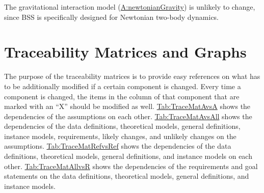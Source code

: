 \documentclass[12pt]{article}
\begin{document}
\begin{description}[font=\normalfont]
\item[Newtonian-Gravity-Model:\phantomsection\label{ucNewtonianGravity}]{The gravitational interaction model (\hyperref[newtonianGravity]{A:newtonianGravity}) is unlikely to change, since BSS is specifically designed for Newtonian two-body dynamics.}
\end{description}
\section{Traceability Matrices and Graphs}
\label{Sec:TraceMatrices}
The purpose of the traceability matrices is to provide easy references on what has to be additionally modified if a certain component is changed. Every time a component is changed, the items in the column of that component that are marked with an ``X'' should be modified as well. \hyperref[Table:TraceMatAvsA]{Tab:TraceMatAvsA} shows the dependencies of the assumptions on each other. \hyperref[Table:TraceMatAvsAll]{Tab:TraceMatAvsAll} shows the dependencies of the data definitions, theoretical models, general definitions, instance models, requirements, likely changes, and unlikely changes on the assumptions. \hyperref[Table:TraceMatRefvsRef]{Tab:TraceMatRefvsRef} shows the dependencies of the data definitions, theoretical models, general definitions, and instance models on each other. \hyperref[Table:TraceMatAllvsR]{Tab:TraceMatAllvsR} shows the dependencies of the requirements and goal statements on the data definitions, theoretical models, general definitions, and instance models.
\end{document}
